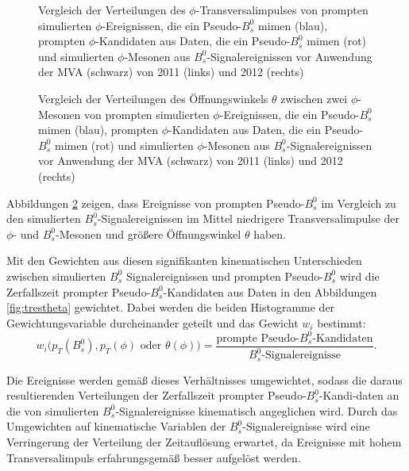 \documentclass{article}
\begin{document}
\begin{figure}[h!]
\caption{Vergleich der Verteilungen des $\phi$-Transversalimpulses von prompten simulierten $\phi$-Ereignissen, die ein Pseudo-$B_s^0$ mimen (blau), prompten $\phi$-Kandidaten aus Daten, die ein Pseudo-$B_s^0$ mimen (rot) und simulierten $\phi$-Mesonen aus $B_s^0$-Signalereignissen vor Anwendung der MVA (schwarz) von 2011 (links) und 2012 (rechts)}
\label{fig:vglphipt}
\end{figure} 

\begin{figure}[h!]
\caption{Vergleich der Verteilungen des Öffnungswinkels $\theta$ zwischen zwei $\phi$-Mesonen von prompten simulierten $\phi$-Ereignissen, die ein Pseudo-$B_s^0$ mimen (blau), prompten $\phi$-Kandidaten aus Daten, die ein Pseudo-$B_s^0$ mimen (rot) und simulierten $\phi$-Mesonen aus $B_s^0$-Signalereignissen vor Anwendung der MVA (schwarz) von 2011 (links) und 2012 (rechts)}
\label{fig:vgltheta}
\end{figure} 

Abbildungen \text{\ref{fig:vglbspt}$\;$-} \ref{fig:vgltheta} zeigen, dass Ereignisse von prompten Pseudo-$B_s^0$ im Vergleich zu den simulierten $B_s^0$-Signalereignissen im Mittel niedrigere Transversalimpulse der $\phi$- und $B_s^0$-Mesonen und größere Öffnungswinkel $\theta$ haben. %

Mit den Gewichten aus diesen signifikanten kinematischen Unterschieden zwischen simulierten $B_s^0$ Signalereignissen und prompten Pseudo-$B_s^0$ wird die Zerfallszeit prompter Pseudo-$B_s^0$-Kandidaten aus Daten in den Abbildungen \text{\ref{fig:tresbspt} -} \ref{fig:trestheta} gewichtet. Dabei werden die beiden Histogramme der Gewichtungsvariable durcheinander geteilt und das Gewicht $w_i$ bestimmt:
\[w_i(p_T(B_s^0),p_T(\phi)\text{ oder }\theta(\phi)\big)=\frac{\text{prompte Pseudo-$B_s^0$-Kandidaten}}{\text{$B_s^0$-Signalereignisse}}.\]

Die Ereignisse werden gemäß dieses Verhältnisses umgewichtet, sodass die daraus resultierenden Verteilungen der Zerfallszeit prompter Pseudo-$B_s^0$-Kandi-daten an die von simulierten $B_s^0$-Signalereignisse kinematisch angeglichen wird. %
Durch das Umgewichten auf kinematische Variablen der $B_s^0$-Signalereignisse wird eine Verringerung der Verteilung der Zeitauflösung erwartet, da Ereignisse mit hohem Transversalimpuls erfahrungsgemäß besser aufgelöst werden. 
\end{document}
